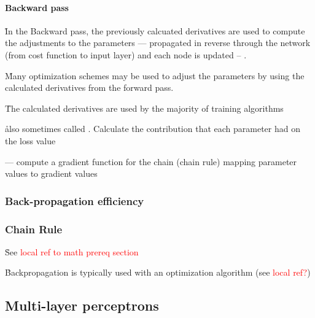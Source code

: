 \paragraph{Backward pass}

\r{In the Backward pass, the previously calcuated derivatives are used to compute the adjustments to the parameters --- propagated in reverse through the network (from cost function to input layer) and each node is updated -- .}

\r{Many optimization schemes  may be used to adjust the parameters by using the calculated derivatives from the forward pass.}

\r{The calculated derivatives are used by the majority of training algorithms}





\r{also sometimes called .  Calculate the contribution that each parameter had on the loss value}

\r{ --- compute a gradient function for the chain (chain rule) mapping parameter values to gradient values}

\subsubsection{Back-propagation efficiency}


\subsubsection{Chain Rule}

\r{See \textcolor{red}{local ref to math prereq section}}


\r{Backpropagation is typically used with an optimization algorithm (see \textcolor{red}{local ref?})}

\subsection{Multi-layer perceptrons}

